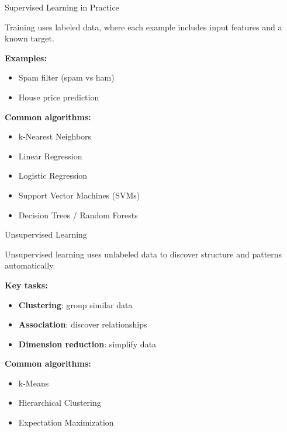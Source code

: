 \documentclass[aspectratio=169]{beamer}
\begin{document}

\begin{frame}{Supervised Learning in Practice}

Training uses labeled data, where each example includes input features and a known target.

\vspace{1em}

\textbf{Examples:}
\begin{itemize}
\item Spam filter (spam vs ham)
\item House price prediction
\end{itemize}

\vspace{1em}

\textbf{Common algorithms:}
\begin{itemize}
\item k-Nearest Neighbors
\item Linear Regression
\item Logistic Regression
\item Support Vector Machines (SVMs)
\item Decision Trees / Random Forests
\end{itemize}

\end{frame}





\begin{frame}{Unsupervised Learning}

Unsupervised learning uses unlabeled data to discover structure and patterns automatically.

\vspace{1em}

\textbf{Key tasks:}
\begin{itemize}
\item \textbf{Clustering}: group similar data
\item \textbf{Association}: discover relationships
\item \textbf{Dimension reduction}: simplify data
\end{itemize}

\vspace{1em}

\textbf{Common algorithms:}
\begin{itemize}
\item k-Means
\item Hierarchical Clustering
\item Expectation Maximization
\end{itemize}

\end{frame}
\end{document}
